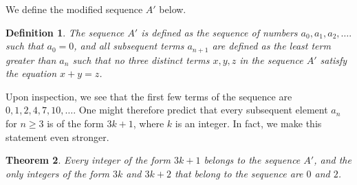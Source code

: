 \documentclass[11pt,letterpaper,twoside,english]{article}
\theoremstyle{theorem}
\newtheorem{theorem}{Theorem}
\newtheorem{definition}[theorem]{Definition}
\theoremstyle{remark}
\begin{document}
We define the modified sequence $A'$ below.

\begin{definition} \label{def:A'}
The sequence $A'$ is defined as the sequence of numbers $a_0, a_1, a_2, \ldots.$ such that $a_0 = 0$, and all subsequent terms $a_{n+1}$ are defined as the least term greater than $a_n$ such that no three distinct terms $x, y, z$ in the sequence $A'$ satisfy the equation $x + y = z$.
\end{definition}

Upon inspection, we see that the first few terms of the sequence are $0, 1, 2, 4, 7, 10, \ldots$. One might therefore predict that every subsequent element $a_n$ for $n \geq 3$ is of the form $3k + 1$, where $k$ is an integer. In fact, we make this statement even stronger.

\begin{theorem}
Every integer of the form $3k + 1$ belongs to the sequence $A'$, and the only integers of the form $3k$ and $3k+2$ that belong to the sequence are $0$ and $2$.
\end{theorem}
\end{document}

